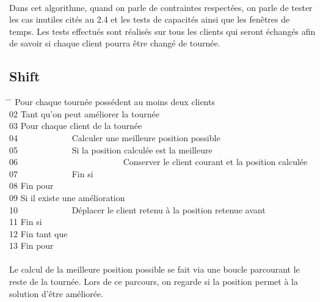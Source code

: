 \documentclass[12pt]{article}
\begin{document}
\paragraph{}
Dans cet algorithme, quand on parle de contraintes respectées, on parle de tester les cas inutiles cités au 2.4 et les tests de capacités ainsi que les fenêtres
de temps. Les tests effectués sont réalisés sur tous les clients qui seront échangés afin de savoir si chaque client pourra être changé de tournée.

\subsection{Shift}

\begin{tabbing}
\hspace{1cm} \= \hspace{1cm} \=   Pour chaque tournée possédent au moins deux clients\\
02  \> Tant qu'on peut améliorer la tournée\\
03  \> \> Pour chaque client de la tournée \\
04  \> \> \ \ \ \ \ \ \ \ \ \ \ \ Calculer une meilleure position possible \\
05  \> \> \ \ \ \ \ \ \ \ \ \ \ \ Si la position calculée est la meilleure\\
06  \> \> \ \ \ \ \ \ \ \ \ \ \ \ \ \ \ \ \ \ \ \ \ \ \ \ Conserver le client courant et la position calculée\\
07  \> \> \ \ \ \ \ \ \ \ \ \ \ \ Fin si \\
08  \> \> Fin pour \\
09  \> \> Si il existe une amélioration \\
10  \> \> \ \ \ \ \ \ \ \ \ \ \ \ Déplacer le client retenu à la position retenue avant \\
11  \> \> Fin si \\
12  \> Fin tant que \\
13  Fin pour \\
\end{tabbing}

\paragraph{}
Le calcul de la meilleure position possible se fait via une boucle parcourant le reste de la tournée. Lors de ce parcours, on regarde si la position 
permet à la solution d'être améliorée.
\end{document}
